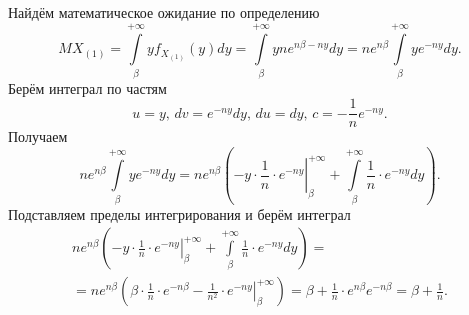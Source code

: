Найдём математическое ожидание  по определению
$$MX_{ \left( 1 \right) } =
  \int \limits_{ \beta }^{+ \infty } yf_{X_{ \left( 1 \right) }} \left( y \right) dy =
  \int \limits_{ \beta }^{+ \infty } yne^{n \beta - ny} dy =
  ne^{n \beta } \int \limits_{ \beta }^{+ \infty } ye^{-ny} dy.$$
Берём интеграл по частям
$$u = y, \,
  dv = e^{-ny} dy, \,
  du = dy, \,
  c = - \frac{1}{n} e^{-ny}.$$
Получаем
$$ne^{n \beta } \int \limits_{ \beta }^{+ \infty } ye^{-ny} dy =
  ne^{n \beta } \left(
    \left. -y \cdot \frac{1}{n} \cdot e^{-ny} \right|_{ \beta }^{+ \infty } +
    \int \limits_{ \beta }^{+ \infty } \frac{1}{n} \cdot e^{-ny} dy
  \right).$$
Подставляем пределы интегрирования и берём интеграл
\begin{equation*}
  \begin{split}
    ne^{n \beta } \left(
      \left. -y \cdot \frac{1}{n} \cdot e^{-ny} \right|_{ \beta }^{+ \infty } +
      \int \limits_{ \beta }^{+ \infty } \frac{1}{n} \cdot e^{-ny} dy
    \right) = \\
    = ne^{n \beta } \left(
      \beta \cdot \frac{1}{n} \cdot e^{-n \beta } -
      \left. \frac{1}{n^2} \cdot e^{-ny} \right|_{ \beta }^{+ \infty }
    \right) =
    \beta + \frac{1}{n} \cdot e^{n \beta } e^{-n \beta } =
    \beta + \frac{1}{n}.
  \end{split}
\end{equation*}
